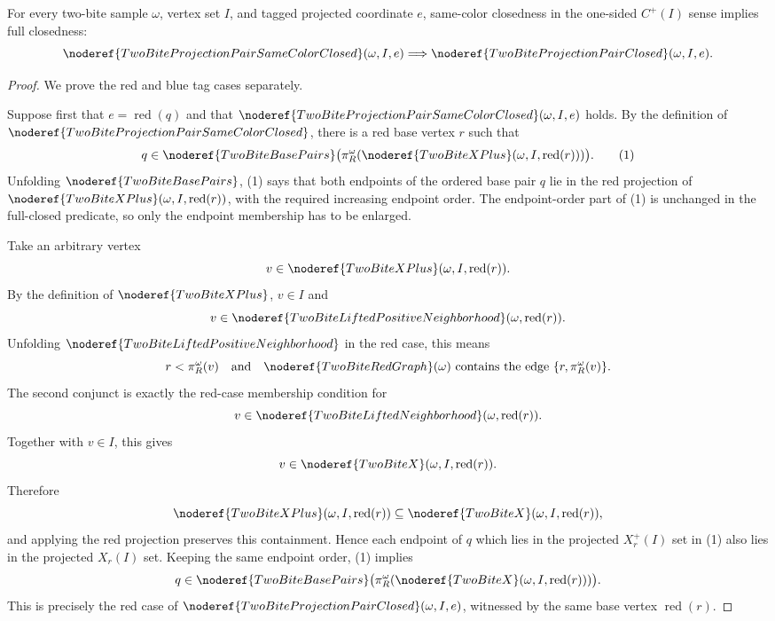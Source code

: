 \begin{helper}
For every two-bite sample \(\omega\), vertex set \(I\), and tagged projected
coordinate \(e\), same-color closedness in the one-sided
\(C^+(I)\) sense implies full closedness:
\[
\noderef{TwoBiteProjectionPairSameColorClosed}(\omega,I,e)
\Longrightarrow
\noderef{TwoBiteProjectionPairClosed}(\omega,I,e).
\]
\end{helper}
\begin{proof}
We prove the red and blue tag cases separately.

Suppose first that \(e=\operatorname{red}(q)\) and that
\(\noderef{TwoBiteProjectionPairSameColorClosed}(\omega,I,e)\) holds.  By the
definition of \(\noderef{TwoBiteProjectionPairSameColorClosed}\), there is a
red base vertex \(r\) such that
\[
q\in
\noderef{TwoBiteBasePairs}
\bigl(\pi_R^\omega(\noderef{TwoBiteXPlus}(\omega,I,\operatorname{red}(r)))\bigr).
\tag{1}
\]
Unfolding \(\noderef{TwoBiteBasePairs}\), (1) says that both endpoints of the
ordered base pair \(q\) lie in the red projection of
\(\noderef{TwoBiteXPlus}(\omega,I,\operatorname{red}(r))\), with the required
increasing endpoint order.  The endpoint-order part of (1) is unchanged in
the full-closed predicate, so only the endpoint membership has to be enlarged.

Take an arbitrary vertex
\[
v\in\noderef{TwoBiteXPlus}(\omega,I,\operatorname{red}(r)).
\]
By the definition of \(\noderef{TwoBiteXPlus}\), \(v\in I\) and
\[
v\in\noderef{TwoBiteLiftedPositiveNeighborhood}(\omega,\operatorname{red}(r)).
\]
Unfolding \(\noderef{TwoBiteLiftedPositiveNeighborhood}\) in the red case,
this means
\[
r<\pi_R^\omega(v)
\quad\text{and}\quad
\noderef{TwoBiteRedGraph}(\omega)\text{ contains the edge }
\{r,\pi_R^\omega(v)\}.
\]
The second conjunct is exactly the red-case membership condition for
\[
v\in\noderef{TwoBiteLiftedNeighborhood}(\omega,\operatorname{red}(r)).
\]
Together with \(v\in I\), this gives
\[
v\in\noderef{TwoBiteX}(\omega,I,\operatorname{red}(r)).
\]
Therefore
\[
\noderef{TwoBiteXPlus}(\omega,I,\operatorname{red}(r))
\subseteq
\noderef{TwoBiteX}(\omega,I,\operatorname{red}(r)),
\]
and applying the red projection preserves this containment.  Hence each
endpoint of \(q\) which lies in the projected \(X_r^+(I)\) set in (1) also
lies in the projected \(X_r(I)\) set.  Keeping the same endpoint order, (1)
implies
\[
q\in
\noderef{TwoBiteBasePairs}
\bigl(\pi_R^\omega(\noderef{TwoBiteX}(\omega,I,\operatorname{red}(r)))\bigr).
\]
This is precisely the red case of
\(\noderef{TwoBiteProjectionPairClosed}(\omega,I,e)\), witnessed by the same
base vertex \(\operatorname{red}(r)\).


\end{proof}

